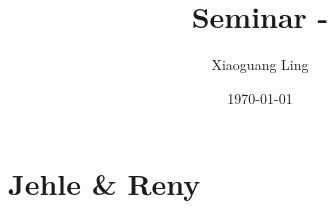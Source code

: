 \documentclass{article}
\title{Seminar  - }
\author{Xiaoguang Ling }
\date{\today}
\begin{document}
\maketitle


\section{Jehle \& Reny }
\end{document}
